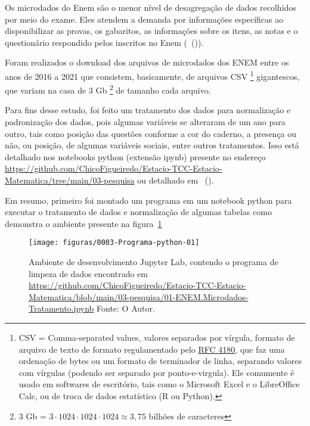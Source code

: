 \documentclass[
	article,			%
	11pt,				%
	oneside,			%
	a4paper,			%
	english,			%
	brazil,				%
	sumario=tradicional
]{abntex2}
\newcommand{\citeaa}[1]{\citeauthoronline{#1}~(\citeyear{#1})}
\begin{document}
			Os microdados do Enem são o menor nível de desagregação de dados recolhidos por meio do exame. Eles atendem a demanda por informações específicas ao disponibilizar as provas, os gabaritos, as informações sobre os itens, as notas e o questionário respondido pelos inscritos no Enem (\citeaa{InepENEM2021}).
			
			Foram realizados o download dos arquivos de microdados dos ENEM entre os anos de 2016 a 2021 que consistem, basicamente, de arquivos CSV \footnote{CSV = Comma-separated values, valores separados por vírgula, formato de arquivo de texto de formato regulamentado pelo \href{https://datatracker.ietf.org/doc/html/rfc4180}{RFC 4180}, que faz uma ordenação de bytes ou um formato de terminador de linha, separando valores com vírgulas (podendo ser separado por ponto-e-virgula). Ele comumente é usado em softwares de escritório, tais como o Microsoft Excel e o LibreOffice Calc, ou de troca de dados estatístico (R ou Python).} gigantescos, que variam na casa de 3 Gb \footnote{3 Gb = $3 \cdot 1024 \cdot 1024 \cdot 1024 \approx 3,75  $ bilhões de caracteres} de tamanho cada arquivo.
			
			Para fins desse estudo, foi feito um tratamento dos dados para normalização e padronização dos dados, pois algumas variáveis se alteraram de um ano para outro, tais como posição das questões conforme a cor do caderno, a presença ou não, ou posição, de algumas variáveis sociais, entre outros tratamentos. Isso está detalhado nos notebooks python (extensão ipynb) presente no endereço \url{https://github.com/ChicoFigueiredo/Estacio-TCC-Estacio-Matematica/tree/main/03-pesquisa} ou detalhado em \citeaa{Figueiredo2021Tese}.

			Em resumo, primeiro foi montado um programa em um notebook python para executar o tratamento de dados e normalização de algumas tabelas como demonstra o ambiente presente na figura~\ref{fig:0003-programa-python-01}

			\begin{figure}[H]
				\centering
				\texttt{[image: figuras/0003-Programa-python-01]}
				\caption[Ambiente de desenvolvimento Jupyter Lab, contendo o programa encontrado em]{Ambiente de desenvolvimento Jupyter Lab, contendo o programa de limpeza de dados encontrado em \url{https://github.com/ChicoFigueiredo/Estacio-TCC-Estacio-Matematica/blob/main/03-pesquisa/01-ENEM.Microdados-Tratamento.ipynb}
					Fonte: O Autor.}
				\label{fig:0003-programa-python-01}
			\end{figure}
			
\end{document}
